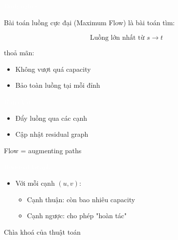 \documentclass{beamer}
\title{\hlred{Bài toán luồng cực đại}}
\author{Group 3}
\date{\hlcyan{03/2026}}
\newcommand{\hlblue}[1]{\textcolor{myblue}{#1}}
\newcommand{\hlgreen}[1]{\textcolor{mygreen}{#1}}
\newcommand{\hlred}[1]{\textcolor{myred}{#1}}
\newcommand{\hlpurple}[1]{\textcolor{mypurple}{#1}}
\newcommand{\hlwhite}[1]{\textcolor{white}{#1}}
\begin{document}
\frame{\titlepage}


\begin{frame}{\hlwhite{Định nghĩa}}
\begin{tcolorbox}[title=\textbf{\hlwhite{Khái niệm}}]
\hlblue{Bài toán luồng cực đại (Maximum Flow)} là bài toán tìm:

\[
\text{Luồng lớn nhất từ } s \rightarrow t
\]

thoả mãn:
\begin{itemize}
\item Không vượt quá \hlgreen{capacity}
\item Bảo toàn luồng tại mỗi đỉnh
\end{itemize}
\end{tcolorbox}
\end{frame}


\begin{frame}{\hlwhite{Bản chất}}
\begin{itemize}
\item Đẩy luồng qua các cạnh
\item Cập nhật \hlblue{residual graph}
\end{itemize}

\begin{tcolorbox}
\centering
\hlpurple{Flow = augmenting paths}
\end{tcolorbox}
\end{frame}


\begin{frame}{\hlwhite{Residual Graph}}
\begin{itemize}
\item Với mỗi cạnh $(u,v)$:
\begin{itemize}
\item Cạnh thuận: còn bao nhiêu capacity
\item Cạnh ngược: cho phép "hoàn tác"
\end{itemize}
\end{itemize}

\begin{tcolorbox}
\centering
\hlred{Chìa khoá của thuật toán}
\end{tcolorbox}
\end{frame}

\end{document}
